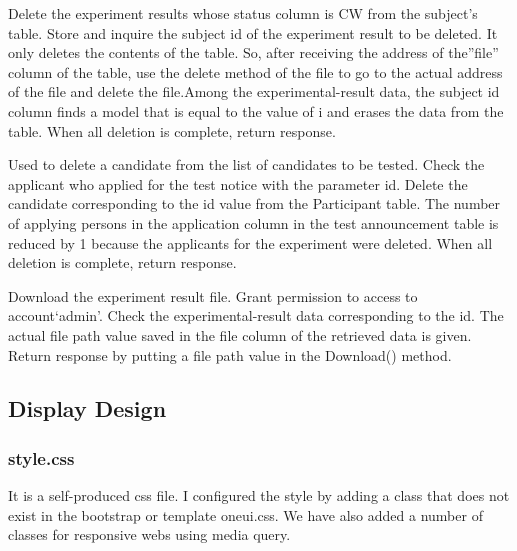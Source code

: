 \documentclass[letterpaper, 10 pt, conference]{ieeeconf}  %
\begin{document}
Delete the experiment results whose status column is CW from the subject’s table. Store and inquire the subject id of the experiment result to be deleted. It only deletes the contents  of  the  table.  So,  after  receiving  the  address  of  the”file” column of the table, use the delete method of the file to  go  to  the  actual  address  of  the  file  and  delete  the  file.Among  the  experimental-result  data,  the  subject  id  column finds  a  model  that  is  equal  to  the  value  of  i  and  erases  the data  from  the  table.  When  all  deletion  is  complete,  return response.\\
Used  to  delete  a  candidate  from  the  list  of candidates to be tested. Check the applicant who applied for the  test  notice  with  the  parameter  id.  Delete  the  candidate corresponding to the id value from the Participant table. The number  of  applying  persons  in  the  application  column  in the  test  announcement  table  is  reduced  by  1  because  the applicants for the experiment were deleted. When all deletion is  complete,  return  response.\\
Download  the experiment result file. Grant permission to access to account‘admin’.  Check  the  experimental-result  data  corresponding to the id. The actual file path value saved in the file column of the retrieved data is given. Return response by putting a file path value in the Download() method.\\





\subsection{Display Design} %
\subsubsection{style.css}
It is a self-produced css file. I configured the style by adding a class that does not exist in the bootstrap or template oneui.css. We have also added a number of classes for responsive webs using media query.\\
\end{document}
